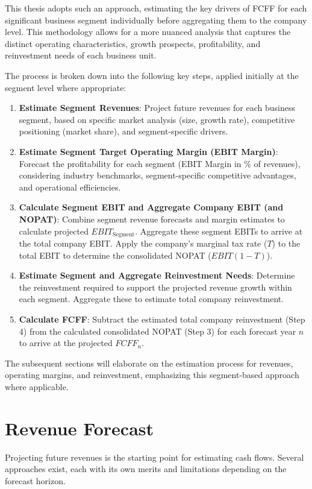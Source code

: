 This thesis adopts such an approach, estimating the key drivers of FCFF for each significant business segment individually before aggregating them to the company level. This methodology allows for a more nuanced analysis that captures the distinct operating characteristics, growth prospects, profitability, and reinvestment needs of each business unit.

The process is broken down into the following key steps, applied initially at the segment level where appropriate:
\begin{enumerate}
    \item \textbf{Estimate Segment Revenues}: Project future revenues for each business segment, based on specific market analysis (size, growth rate), competitive positioning (market share), and segment-specific drivers.
    \item \textbf{Estimate Segment Target Operating Margin (EBIT Margin)}: Forecast the profitability for each segment (EBIT Margin in \% of revenues), considering industry benchmarks, segment-specific competitive advantages, and operational efficiencies.
    \item \textbf{Calculate Segment EBIT and Aggregate Company EBIT (and NOPAT)}: Combine segment revenue forecasts and margin estimates to calculate projected \(EBIT_{\text{Segment}}\). Aggregate these segment EBITs to arrive at the total company EBIT. Apply the company's marginal tax rate (\(T\)) to the total EBIT to determine the consolidated NOPAT (\(EBIT(1-T)\)).
    \item \textbf{Estimate Segment and Aggregate Reinvestment Needs}: Determine the reinvestment required to support the projected revenue growth within each segment. Aggregate these to estimate total company reinvestment.
    \item \textbf{Calculate FCFF}: Subtract the estimated total company reinvestment (Step 4) from the calculated consolidated NOPAT (Step 3) for each forecast year \(n\) to arrive at the projected \(FCFF_n\).
\end{enumerate}

The subsequent sections will elaborate on the estimation process for revenues, operating margins, and reinvestment, emphasizing this segment-based approach where applicable.

\section{Revenue Forecast} \label{sec:revenue_forecast}
Projecting future revenues is the starting point for estimating cash flows. Several approaches exist, each with its own merits and limitations depending on the forecast horizon.

